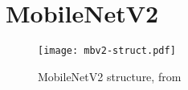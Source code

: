 \chapter{MobileNetV2} \label{appendix:mbv2}
%
\begin{figure}[H]
    \texttt{[image: mbv2-struct.pdf]}
    \caption{MobileNetV2 structure, from \cite{sandler_mobilenetv2_2018}}
\end{figure}
\newpage
